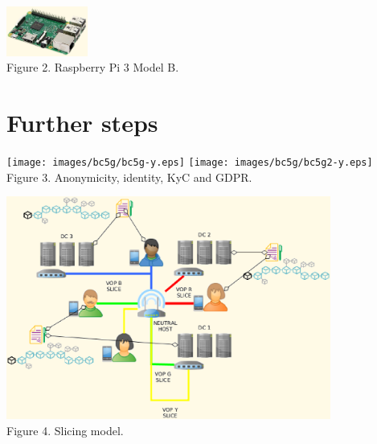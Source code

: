 \documentclass[12pt]{amsart}
\begin{document}
\begin{multicols}{2}
\begin{center}
  \includegraphics[keepaspectratio, width=0.2\textwidth]{images/rpi3modelb-sourceamazon.eps}
\\
Figure 2. Raspberry Pi 3 Model B.
\\
\end{center}






\section{Further steps}

\end{multicols}
\begin{center}
  \texttt{[image: images/bc5g/bc5g-y.eps]}
  \texttt{[image: images/bc5g/bc5g2-y.eps]}
\\
Figure 3. Anonymicity, identity, KyC and GDPR.
\\
\end{center}
\begin{multicols}{2}

\end{multicols}
\begin{center}
  \includegraphics[keepaspectratio, width=0.8\textwidth]{images/bc5g/slices-y.eps}
\\
Figure 4. Slicing model.
\\
\end{center}
\end{document}
